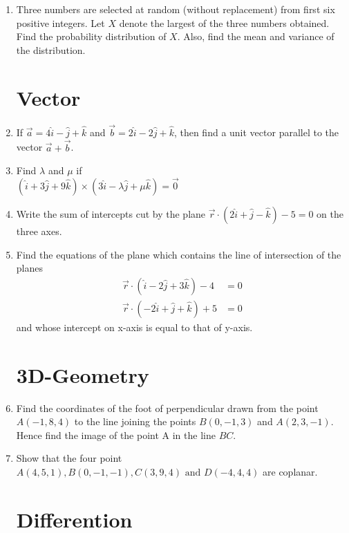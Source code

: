 \documentclass[10pt,-letter paper]{article}
\providecommand{\brak}[1]{\ensuremath{\left(#1\right)}}
\begin{document}
\begin{enumerate}
\item Three numbers are selected at random (without replacement) from first six positive integers. Let $X$ denote the largest of the three numbers obtained. Find the probability distribution of $X$. Also, find the mean and variance of the distribution.

\section{Vector}

\item If $\overrightarrow{a} = 4\hat{i} -\hat{j} + \hat{k}$ and $\overrightarrow{b} = 2\hat{i} -2\hat{j} + \hat{k} $, then find a unit vector parallel to the vector $\overrightarrow{a} + \overrightarrow{b} $.

\item Find $\lambda$ and $\mu$ if\\
$\brak{\hat{i} + 3\hat{j} + 9\hat{k}}\times\brak{3\hat{i} - \lambda\hat{j} + \mu\hat{k}} = \overrightarrow{0}$

\item Write the sum of intercepts cut by the plane $\overrightarrow{r}\cdot\brak{2\hat{i} + \hat{j} - \hat{k}} - 5 = 0$ on the three axes.

\item Find the equations of the plane which contains the line of intersection of the planes
\begin{align*}\overrightarrow{r}\cdot\brak{\hat{i} -2\hat{j} + 3\hat{k}}-4&=0\\
\overrightarrow{r}\cdot\brak{-2\hat{i} + \hat{j} + \hat{k}}+5&=0 
\end{align*}
and whose intercept on x-axis is equal to that of y-axis.

\section{3D-Geometry}

\item Find the coordinates of the foot of perpendicular drawn from the point $A\brak{-1,8,4}$ to the line joining the points $B\brak{0,-1,3}$ and $A\brak{2,3,-1}$. Hence find the image of the point A in the line $BC$.

\item Show that the four point $A\brak{4, 5, 1}, B\brak{0,-1,-1}, C\brak{3,9,4} \text{ and } D\brak{-4,4,4}$ are coplanar.

\section{Differention}


\end{enumerate}
\end{document}
